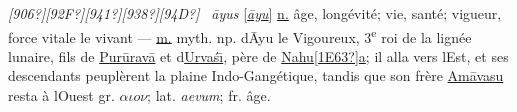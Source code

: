 \documentclass[12pt,twoside]{article}
\begin{document}
\textit{[906?][92F?][941?][938?][94D?] }\textit{\ }\textit{\=ayus}
[\href{http://sanskrit.inria.fr/DICO/10.html#aayu}{\textit{\=ayu}}]
\href{http://sanskrit.inria.fr/cgi-bin/sktdeclin?q=aayus;g=Neu;r=}{n.}
\^age, long\'evit\'e; vie, sant\'e; vigueur, force vitale {\textbar} le
vivant {---}
\href{http://sanskrit.inria.fr/cgi-bin/sktdeclin?q=aayus;g=Mas;r=}{m.}
myth. np. d{\textquotesingle}\=Ayu {\guillemotleft}le
Vigoureux{\guillemotright}, 3\textsuperscript{e} roi de la lign\'ee
lunaire, fils de
\href{http://sanskrit.inria.fr/DICO/41.html#Upuruuravaa}{Pur\=urav\=a}
et
d{\textquotesingle}\href{http://sanskrit.inria.fr/DICO/15.html#Uurvashii}{Urva\'s\=\i},
p\`ere de
\href{http://sanskrit.inria.fr/DICO/34.html#Unahu.sa}{Nahu}\href{http://sanskrit.inria.fr/DICO/34.html#Unahu.sa}{[1E63?]}\href{http://sanskrit.inria.fr/DICO/34.html#Unahu.sa}{a};
il alla vers l{\textquotesingle}Est, et ses descendants peupl\`erent la
plaine Indo{}-Gang\'etique, tandis que son fr\`ere
\href{http://sanskrit.inria.fr/DICO/5.html#Uamaavasu}{Am\=avasu} resta
\`a l{\textquotesingle}Ouest {\textbar}{\textbar} gr.
${\alpha}$${\iota}$$o$${\nu}$; lat. \textit{aevum}; fr. \^age.
\end{document}
